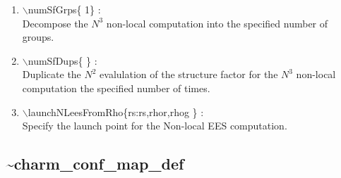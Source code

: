 \documentclass[12pt,titlepage]{article}
\begin{document}
\begin{enumerate}
  \vspace{0.15in} 
  \item $\backslash$numSfGrps\{ 1\} : \\    
  Decompose the $N^3$ non-local computation into the specified number of groups.
  \vspace{0.15in} 
  \item $\backslash$numSfDups\{ \} : \\    
  Duplicate the $N^2$ evalulation of the structure factor for the
  $N^3$ non-local computation the specified number of times.
  \vspace{0.15in} 
  \item $\backslash$launchNLeesFromRho\{rs:rs,rhor,rhog \} : \\  
  Specify the launch point for the Non-local EES computation.
\end{enumerate}

\newpage
\subsection*{\bf \~{ }charm\_conf\_map\_def}
\end{document}
